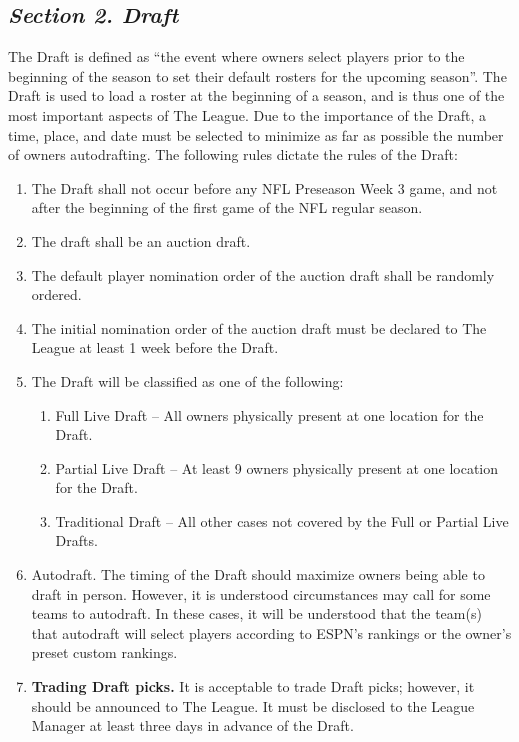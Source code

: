 \documentclass{article}
\begin{document}
    \subsection{\textit{Section 2. Draft}}
    The Draft is defined as “the event where owners select players prior to the beginning of the season to set their default rosters for the upcoming season”. The Draft is used to load a roster at the beginning of a season, and is thus one of the most important aspects of The League. Due to the importance of the Draft, a time, place, and date must be selected to minimize as far as possible the number of owners autodrafting. The following rules dictate the rules of the Draft:
    \begin{enumerate}[label=\Alph*)]
        \item The Draft shall not occur before any NFL Preseason Week 3 game, and not after the beginning of the first game of the NFL regular season.
        \item The draft shall be an auction draft.
        \item The default player nomination order of the auction draft shall be randomly ordered.
        \item The initial nomination order of the auction draft must be declared to The League at least 1 week before the Draft.
        \item The Draft will be classified as one of the following:
        \begin{enumerate}[label=\roman*)]
            \item Full Live Draft – All owners physically present at one location for the Draft.
            \item Partial Live Draft – At least 9 owners physically present at one location for the Draft.
            \item Traditional Draft – All other cases not covered by the Full or Partial Live Drafts.
        \end{enumerate}
        \item Autodraft. The timing of the Draft should maximize owners being able to draft in person. However, it is understood circumstances may call for some teams to autodraft. In these cases, it will be understood that the team(s) that autodraft will select players according to ESPN’s rankings or the owner’s preset custom rankings.
        \item \textbf{Trading Draft picks.} It is acceptable to trade Draft picks; however, it should be announced to The League. It must be disclosed to the League Manager at least three days in advance of the Draft.
    \end{enumerate}
\end{document}
